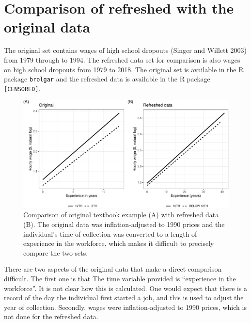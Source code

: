 \documentclass{article}
\begin{document}
\hypertarget{compare}{%
\section{Comparison of refreshed with the original data}\label{compare}}

The original set contains wages of high school dropouts (Singer and Willett 2003) from 1979 through to 1994. The refreshed data set for comparison is also wages on high school dropouts from 1979 to 2018. The original set is available in the R package \texttt{brolgar} and the refreshed data is available in the R package \texttt{[CENSORED]}.

\begin{figure}

{\centering \includegraphics[width=1\linewidth]{figures/plotting-sw-do-1} 

}

\caption{Comparison of original textbook example (A) with refreshed data (B). The original data was inflation-adjusted to 1990 prices and the individual's time of collection was converted to a length of experience in the workforce, which makes it difficult to precisely compare the two sets.}\label{fig:plotting-sw-do}
\end{figure}

There are two aspects of the original data that make a direct comparison difficult. The first one is that The time variable provided is ``experience in the workforce''. It is not clear how this is calculated. One would expect that there is a record of the day the individual first started a job, and this is used to adjust the year of collection. Secondly, wages were inflation-adjusted to 1990 prices, which is not done for the refreshed data.
\end{document}
